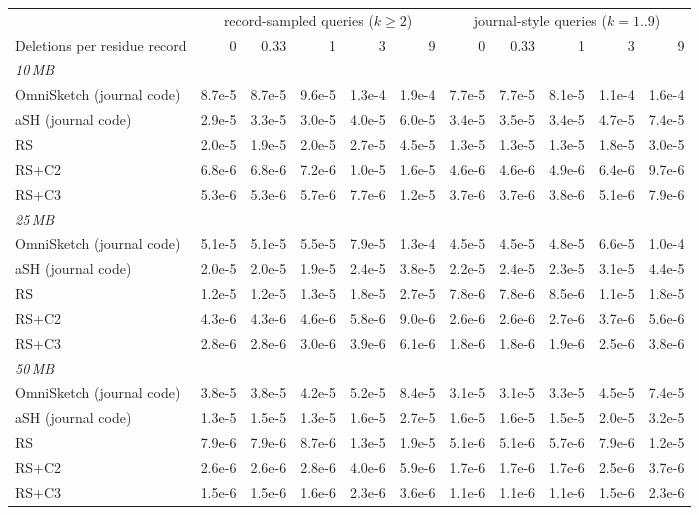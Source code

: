 \begin{tabular}{lrrrrrrrrrr}
\toprule
 & \multicolumn{5}{c}{record-sampled queries ($k\ge2$)} & \multicolumn{5}{c}{journal-style queries ($k=1..9$)} \\
Deletions per residue record & 0 & 0.33 & 1 & 3 & 9 & 0 & 0.33 & 1 & 3 & 9 \\
\midrule
\multicolumn{11}{l}{\emph{10\,MB}} \\
OmniSketch (journal code) & 8.7e-5 & 8.7e-5 & 9.6e-5 & 1.3e-4 & 1.9e-4 & 7.7e-5 & 7.7e-5 & 8.1e-5 & 1.1e-4 & 1.6e-4 \\
aSH (journal code) & 2.9e-5 & 3.3e-5 & 3.0e-5 & 4.0e-5 & 6.0e-5 & 3.4e-5 & 3.5e-5 & 3.4e-5 & 4.7e-5 & 7.4e-5 \\
RS & 2.0e-5 & 1.9e-5 & 2.0e-5 & 2.7e-5 & 4.5e-5 & 1.3e-5 & 1.3e-5 & 1.3e-5 & 1.8e-5 & 3.0e-5 \\
RS+C2 & 6.8e-6 & 6.8e-6 & 7.2e-6 & 1.0e-5 & 1.6e-5 & 4.6e-6 & 4.6e-6 & 4.9e-6 & 6.4e-6 & 9.7e-6 \\
RS+C3 & 5.3e-6 & 5.3e-6 & 5.7e-6 & 7.7e-6 & 1.2e-5 & 3.7e-6 & 3.7e-6 & 3.8e-6 & 5.1e-6 & 7.9e-6 \\
\multicolumn{11}{l}{\emph{25\,MB}} \\
OmniSketch (journal code) & 5.1e-5 & 5.1e-5 & 5.5e-5 & 7.9e-5 & 1.3e-4 & 4.5e-5 & 4.5e-5 & 4.8e-5 & 6.6e-5 & 1.0e-4 \\
aSH (journal code) & 2.0e-5 & 2.0e-5 & 1.9e-5 & 2.4e-5 & 3.8e-5 & 2.2e-5 & 2.4e-5 & 2.3e-5 & 3.1e-5 & 4.4e-5 \\
RS & 1.2e-5 & 1.2e-5 & 1.3e-5 & 1.8e-5 & 2.7e-5 & 7.8e-6 & 7.8e-6 & 8.5e-6 & 1.1e-5 & 1.8e-5 \\
RS+C2 & 4.3e-6 & 4.3e-6 & 4.6e-6 & 5.8e-6 & 9.0e-6 & 2.6e-6 & 2.6e-6 & 2.7e-6 & 3.7e-6 & 5.6e-6 \\
RS+C3 & 2.8e-6 & 2.8e-6 & 3.0e-6 & 3.9e-6 & 6.1e-6 & 1.8e-6 & 1.8e-6 & 1.9e-6 & 2.5e-6 & 3.8e-6 \\
\multicolumn{11}{l}{\emph{50\,MB}} \\
OmniSketch (journal code) & 3.8e-5 & 3.8e-5 & 4.2e-5 & 5.2e-5 & 8.4e-5 & 3.1e-5 & 3.1e-5 & 3.3e-5 & 4.5e-5 & 7.4e-5 \\
aSH (journal code) & 1.3e-5 & 1.5e-5 & 1.3e-5 & 1.6e-5 & 2.7e-5 & 1.6e-5 & 1.6e-5 & 1.5e-5 & 2.0e-5 & 3.2e-5 \\
RS & 7.9e-6 & 7.9e-6 & 8.7e-6 & 1.3e-5 & 1.9e-5 & 5.1e-6 & 5.1e-6 & 5.7e-6 & 7.9e-6 & 1.2e-5 \\
RS+C2 & 2.6e-6 & 2.6e-6 & 2.8e-6 & 4.0e-6 & 5.9e-6 & 1.7e-6 & 1.7e-6 & 1.7e-6 & 2.5e-6 & 3.7e-6 \\
RS+C3 & 1.5e-6 & 1.5e-6 & 1.6e-6 & 2.3e-6 & 3.6e-6 & 1.1e-6 & 1.1e-6 & 1.1e-6 & 1.5e-6 & 2.3e-6 \\
\bottomrule
\end{tabular}
